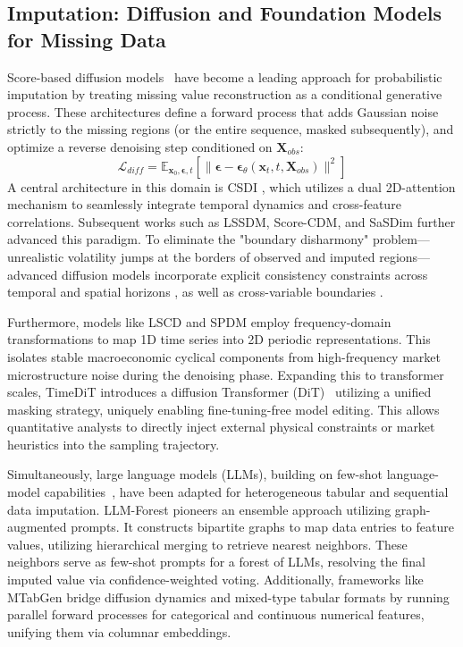 \documentclass[11pt,a4paper]{article}
\providecommand{\DIFaddtex}[1]{{\protect\color{blue}\uwave{#1}}} %
\providecommand{\DIFaddbegin}{} %
\providecommand{\DIFaddend}{} %
\providecommand{\DIFdelbegin}{} %
\providecommand{\DIFdelend}{} %
\providecommand{\DIFadd}[1]{\texorpdfstring{\DIFaddtex{#1}}{#1}} %
\providecommand{\DIFscaledelfig}{0.5}
\newlength{\DIFdelgraphicswidth} %
\newlength{\DIFdelgraphicsheight} %
\providecommand{\DIFaddincludegraphics}[2][]{{\color{blue}\fbox{\DIFOincludegraphics[#1]{#2}}}} %
\providecommand{\DIFdelincludegraphics}[2][]{%
\sbox{\DIFdelgraphicsbox}{\DIFOincludegraphics[#1]{#2}}%
\settoboxwidth{\DIFdelgraphicswidth}{\DIFdelgraphicsbox} %
\settoboxtotalheight{\DIFdelgraphicsheight}{\DIFdelgraphicsbox} %
\scalebox{\DIFscaledelfig}{%
\parbox[b]{\DIFdelgraphicswidth}{\usebox{\DIFdelgraphicsbox}\\[-\baselineskip] \rule{\DIFdelgraphicswidth}{0em}}\llap{\resizebox{\DIFdelgraphicswidth}{\DIFdelgraphicsheight}{%
\setlength{\unitlength}{\DIFdelgraphicswidth}%
\begin{picture}(1,1)%
\thicklines\linethickness{2pt} %
{\color[rgb]{1,0,0}\put(0,0){\framebox(1,1){}}}%
{\color[rgb]{1,0,0}\put(0,0){\line( 1,1){1}}}%
{\color[rgb]{1,0,0}\put(0,1){\line(1,-1){1}}}%
\end{picture}%
}\hspace*{3pt}}} %
} %
\DeclareRobustCommand{\DIFaddbegin}{\DIFOaddbegin \let\includegraphics\DIFaddincludegraphics} %
\DeclareRobustCommand{\DIFaddend}{\DIFOaddend \let\includegraphics\DIFOincludegraphics} %
\DeclareRobustCommand{\DIFdelbegin}{\DIFOdelbegin \let\includegraphics\DIFdelincludegraphics} %
\DeclareRobustCommand{\DIFdelend}{\DIFOaddend \let\includegraphics\DIFOincludegraphics} %
\begin{document}
\subsection{Imputation: Diffusion and Foundation Models for Missing Data}

Score-based diffusion models~\citep{ho2020ddpm,song2019generative,song2021score} have become a leading approach for probabilistic imputation by treating missing value reconstruction as a conditional generative process. These architectures define a forward process that adds Gaussian noise strictly to the missing regions (or the entire sequence, masked subsequently), and optimize a reverse denoising step conditioned on $\mathbf{X}_{obs}$:
\begin{equation}
\mathcal{L}_{diff} = \mathbb{E}_{\mathbf{x}_0, \boldsymbol{\epsilon}, t}[\|\boldsymbol{\epsilon} - \boldsymbol{\epsilon}_\theta(\mathbf{x}_t, t, \mathbf{X}_{obs})\|^2]
\end{equation}
A central architecture in this domain is CSDI \citep{tashiro2021csdi}, which utilizes a dual 2D-attention mechanism to seamlessly integrate temporal dynamics and cross-feature correlations. Subsequent works such as LSSDM, Score-CDM, and SaSDim \citep{LSSDM, Score-CDM, SaSDim} further advanced this paradigm. To eliminate the "boundary disharmony" problem—unrealistic volatility jumps at the borders of observed and imputed regions—advanced diffusion models incorporate explicit consistency constraints across temporal and spatial horizons\DIFdelbegin %
\DIFdelend , as well as \DIFaddbegin \DIFadd{across }\DIFaddend cross-variable boundaries\DIFdelbegin %
\DIFdelend .

Furthermore, models like LSCD \citep{fons2025lscd} and SPDM \citep{SPDM} employ frequency-domain transformations to map 1D time series into 2D periodic representations. This isolates stable macroeconomic cyclical components from high-frequency market microstructure noise during the denoising phase. Expanding this to transformer scales, TimeDiT \citep{cao2024timedit} introduces a diffusion Transformer (DiT)~\citep{peebles2023scalable} utilizing a unified masking strategy, uniquely enabling fine-tuning-free model editing. This allows quantitative analysts to directly inject external physical constraints or market heuristics into the sampling trajectory.

Simultaneously, large language models (LLMs), building on few-shot language-model capabilities~\citep{brown2020language}, have been adapted for heterogeneous tabular and sequential data imputation. LLM-Forest \citep{chen2023llmforest} pioneers an ensemble approach utilizing graph-augmented prompts. It constructs bipartite graphs to map data entries to feature values, utilizing hierarchical merging to retrieve nearest neighbors. These neighbors serve as few-shot prompts for a forest of LLMs, resolving the final imputed value via confidence-weighted voting. Additionally, frameworks like MTabGen \citep{liu2023mtabgen} bridge diffusion dynamics and mixed-type tabular formats by running parallel forward processes for categorical and continuous numerical features, unifying them via columnar embeddings.
\end{document}
